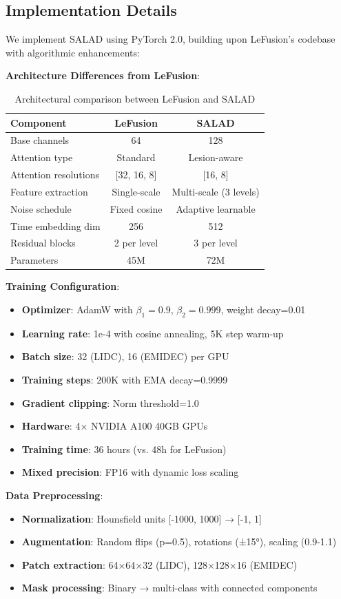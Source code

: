 \documentclass[10pt,twocolumn,letterpaper]{article}
\begin{document}
\subsection{Implementation Details}

We implement SALAD using PyTorch 2.0, building upon LeFusion's codebase with algorithmic enhancements:

\textbf{Architecture Differences from LeFusion}:
\begin{table}[h]
\centering
\caption{Architectural comparison between LeFusion and SALAD}
\small
\begin{tabular}{lcc}
\toprule
Component & LeFusion & SALAD \\
\midrule
Base channels & 64 & 128 \\
Attention type & Standard & Lesion-aware \\
Attention resolutions & [32, 16, 8] & [16, 8] \\
Feature extraction & Single-scale & Multi-scale (3 levels) \\
Noise schedule & Fixed cosine & Adaptive learnable \\
Time embedding dim & 256 & 512 \\
Residual blocks & 2 per level & 3 per level \\
Parameters & 45M & 72M \\
\bottomrule
\end{tabular}
\end{table}

\textbf{Training Configuration}:
\begin{itemize}
    \item \textbf{Optimizer}: AdamW with $\beta_1=0.9$, $\beta_2=0.999$, weight decay=0.01
    \item \textbf{Learning rate}: 1e-4 with cosine annealing, 5K step warm-up
    \item \textbf{Batch size}: 32 (LIDC), 16 (EMIDEC) per GPU
    \item \textbf{Training steps}: 200K with EMA decay=0.9999
    \item \textbf{Gradient clipping}: Norm threshold=1.0
    \item \textbf{Hardware}: 4× NVIDIA A100 40GB GPUs
    \item \textbf{Training time}: 36 hours (vs. 48h for LeFusion)
    \item \textbf{Mixed precision}: FP16 with dynamic loss scaling
\end{itemize}

\textbf{Data Preprocessing}:
\begin{itemize}
    \item \textbf{Normalization}: Hounsfield units [-1000, 1000] → [-1, 1]
    \item \textbf{Augmentation}: Random flips (p=0.5), rotations (±15°), scaling (0.9-1.1)
    \item \textbf{Patch extraction}: 64×64×32 (LIDC), 128×128×16 (EMIDEC)
    \item \textbf{Mask processing}: Binary → multi-class with connected components
\end{itemize}
\end{document}
